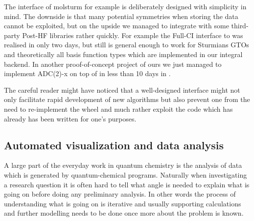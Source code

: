 The \python interface of molsturm for example is deliberately designed
with simplicity in mind.
The downside is that many potential symmetries when storing the data
cannot be exploited,
but on the upside we managed to integrate \molsturm
with some third-party Post-HF libraries rather quickly.
For example the Full-CI interface to \pyscf was realised in only two days,
but still is general enough to work for Sturmians GTOs and theoretically
all basis function types which are implemented in our integral backend.
In another proof-of-concept project of ours we just managed to
implement ADC(2)-x on top of \molsturm in less than 10 days in \python.

The careful reader might have noticed that a well-designed interface
might not only facilitate rapid development of new algorithms
but also prevent one from the need to re-implement the wheel
and much rather exploit the code which has already has been written
for one's purposes.

%


%




\subsection{Automated visualization and data analysis}
A large part of the everyday work in quantum chemistry
is the analysis of data which is generated by quantum-chemical programs.
Naturally when investigating a research question it is often
hard to tell what angle is needed to explain what is going on
before doing any preliminary analysis.
In other words the process of understanding what is going on is iterative
and usually supporting calculations and further modelling
needs to be done once more about the problem is known.

